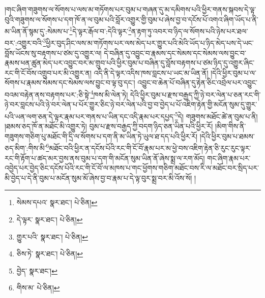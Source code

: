 །གང་ཞིག་གཟུགས་ལ་སོགས་པ་ལས་མ་གཏོགས་པར་བུམ་པ་གཞན་དུ་མ་དམིགས་པའི་ཕྱིར་གནས་སྐབས་དེ་ལྟ་བུའི་གཟུགས་ལ་སོགས་པ་དག་ཁོ་ན་ལ་བུམ་པའི་བློར་འགྱུར་གྱི་བུམ་པ་ཞེས་བྱ་བ་དངོས་པོ་འགའ་ཞིག་ཡོད་པ་ནི་མ་ཡིན་ནོ་སྙམ་དུ་:སེམས་པ་\footnote{སེམས་དཔའ་  སྣར་ཐང་།  པེ་ཅིན། }དེ་ལྟར་རྒོལ་བ་:དེའི་ལྟར་\footnote{དེ་ལྟར་  སྣར་ཐང་།  པེ་ཅིན། }ན་རྟག་ཏུ་འབར་བ་ཉིད་ལ་སོགས་པའི་ཉེས་པར་ཐལ་བར་:འགྱུར་བའི་\footnote{གྱུར་པའི་  སྣར་ཐང་།  པེ་ཅིན། }ཕྱིར་བུད་ཤིང་ལས་མ་གཏོགས་པར་ལས་མེད་པར་གྱུར་པའི་མེའི་ཡོད་པ་ཉིད་མེད་པས་དེ་ཡང་བློས་ཡོངས་སུ་བརྟགས་པ་ཙམ་དུ་འགྱུར་ལ། དེ་བཞིན་དུ་འབྱུང་བ་རྣམས་དང་སེམས་དང་སེམས་ལས་བྱུང་བ་རྣམས་ཕན་ཚུན་མེད་པར་འབྱུང་བར་མ་གྲུབ་པའི་ཕྱིར་བུམ་པ་བཞིན་དུ་བློས་བརྟགས་པ་ཙམ་ཉིད་དུ་འགྱུར་ཞིང་རང་གི་ངོ་བོས་འགྲུབ་པར་མི་འགྱུར་ན། འདི་ནི་དེ་ལྟར་འདིས་ཁས་བླངས་པ་ཡང་མ་ཡིན་ནོ། །དེའི་ཕྱིར་བུམ་པ་ལ་སོགས་པ་རྣམས་སེམས་དང་སེམས་ལས་བྱུང་བ་ལྟ་བུ་དང་། འབྱུང་བ་ཆེན་པོ་བཞིན་དུ་རྟེན་ཅིང་འབྲེལ་པར་འབྱུང་བའམ་བརྟེན་ནས་བརྟགས་པར་:ཅི་སྟེ་\footnote{ཅིས་ཏེ་  སྣར་ཐང་།  པེ་ཅིན། }ཁས་མི་ལེན་ཏེ། དེའི་ཕྱིར་བུམ་པ་རྫས་བརྒྱད་ཀྱི་ཉེ་བར་ལེན་པ་ཅན་རང་གི་ཉེ་བར་བླངས་པའི་ཉེ་བར་ལེན་པ་པོར་གྱུར་ཅིང་ཉེ་བར་ལེན་པའི་བྱ་བ་བྱེད་པ་པོ་འཇིག་རྟེན་གྱི་མངོན་སུམ་དུ་གྱུར་པའི་ཡན་ལག་ཅན་དེ་ལྟར་རྣམ་པར་གནས་པ་ཡིན་དང་འདི་རྣམ་པར་དཔྱད་\footnote{བྱེད་  སྣར་ཐང་། }དེ། གཟུགས་མཐོང་ཚེ་ན་བུམ་པ་ནི། །ཐམས་ཅད་ཁོ་ན་མཐོང་མི་འགྱུར་ཏེ། བུམ་པ་རྫས་བརྒྱད་ཀྱི་བདག་ཉིད་ཅན་ཡིན་པའི་ཕྱིར་རོ། །མིག་གིས་ནི་གཟུགས་གཅིག་པུ་མཐོང་གི་དྲི་ལ་སོགས་པ་དག་ནི་མ་ཡིན་ཏེ་ཡུལ་ཐ་དད་པའི་ཕྱིར་རོ། །དེའི་ཕྱིར་བུམ་པ་ཐམས་ཅད་མིག་:གིས་མི་\footnote{གིས་མ་  པེ་ཅིན། }མཐོང་བའི་ཕྱིར་ན་དངོས་པོའི་རང་གི་ངོ་བོ་རྣམ་པར་མ་ཕྱེ་བས་འཇིག་རྟེན་ཅི་རུང་རུང་ལྟར་རང་གི་རྟོག་པ་ཚད་མར་བྱས་ནས་བུམ་པ་དག་གི་མངོན་སུམ་ཡིན་ནོ་ཞེས་སྨྲ་ལ་རག་མོད། གང་ཞིག་རྣམ་པར་འབྱེད་པར་བྱེད་ཅིང་དངོས་པོའི་རང་གི་ངོ་བོ་ལ་མཁས་པ་གང་ཕྱོགས་གཅིག་མཐོང་བས་རི་ལ་མཐོང་བར་སྲིད་པར་མི་བྱེད་པ་དེ་ནི་བུམ་པ་མངོན་སུམ་མོ་ཞེས་བྱ་བ་རྣམ་པ་དེ་ལྟ་བུར་སྨྲ་བར་མི་འོས་སོ། །
